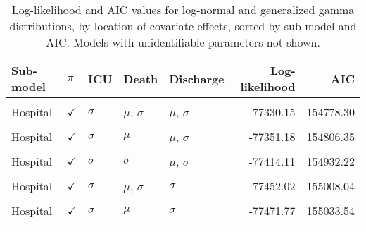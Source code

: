 \begin{table}[!h]
\centering
\caption{\label{tab:gof_place}Log-likelihood and AIC values for log-normal and generalized gamma distributions, by location of covariate effects, sorted by sub-model and AIC. Models with unidentifiable parameters not shown.}
\centering
\begin{tabular}[t]{lllllrr}
\toprule
Sub-model & $\pi$ & ICU & Death & Discharge & Log-likelihood & AIC\\
\midrule
\cellcolor{gray!10}{Hospital} & \cellcolor{gray!10}{$\checkmark$} & \cellcolor{gray!10}{$\mu$} & \cellcolor{gray!10}{$\mu$, $\sigma$} & \cellcolor{gray!10}{$\mu$, $\sigma$} & \cellcolor{gray!10}{-77328.69} & \cellcolor{gray!10}{154775.39}\\
Hospital & $\checkmark$ & $\sigma$ & $\mu$, $\sigma$ & $\mu$, $\sigma$ & -77330.15 & 154778.30\\
\cellcolor{gray!10}{Hospital} & \cellcolor{gray!10}{$\checkmark$} & \cellcolor{gray!10}{$\mu$} & \cellcolor{gray!10}{$\mu$} & \cellcolor{gray!10}{$\mu$, $\sigma$} & \cellcolor{gray!10}{-77349.89} & \cellcolor{gray!10}{154803.78}\\
Hospital & $\checkmark$ & $\sigma$ & $\mu$ & $\mu$, $\sigma$ & -77351.18 & 154806.35\\
\cellcolor{gray!10}{Hospital} & \cellcolor{gray!10}{$\checkmark$} & \cellcolor{gray!10}{$\mu$} & \cellcolor{gray!10}{$\sigma$} & \cellcolor{gray!10}{$\mu$, $\sigma$} & \cellcolor{gray!10}{-77412.52} & \cellcolor{gray!10}{154929.04}\\
Hospital & $\checkmark$ & $\sigma$ & $\sigma$ & $\mu$, $\sigma$ & -77414.11 & 154932.22\\
\cellcolor{gray!10}{Hospital} & \cellcolor{gray!10}{$\checkmark$} & \cellcolor{gray!10}{$\mu$} & \cellcolor{gray!10}{$\mu$, $\sigma$} & \cellcolor{gray!10}{$\sigma$} & \cellcolor{gray!10}{-77450.65} & \cellcolor{gray!10}{155005.30}\\
Hospital & $\checkmark$ & $\sigma$ & $\mu$, $\sigma$ & $\sigma$ & -77452.02 & 155008.04\\
\cellcolor{gray!10}{Hospital} & \cellcolor{gray!10}{$\checkmark$} & \cellcolor{gray!10}{$\mu$} & \cellcolor{gray!10}{$\mu$} & \cellcolor{gray!10}{$\sigma$} & \cellcolor{gray!10}{-77470.37} & \cellcolor{gray!10}{155030.74}\\
Hospital & $\checkmark$ & $\sigma$ & $\mu$ & $\sigma$ & -77471.77 & 155033.54\\
\cellcolor{gray!10}{Hospital} & \cellcolor{gray!10}{$\checkmark$} & \cellcolor{gray!10}{$\mu$} & \cellcolor{gray!10}{$\sigma$} & \cellcolor{gray!10}{$\sigma$} & \cellcolor{gray!10}{-77534.72} & \cellcolor{gray!10}{155159.44}\\

\end{tabular}
\end{table}
